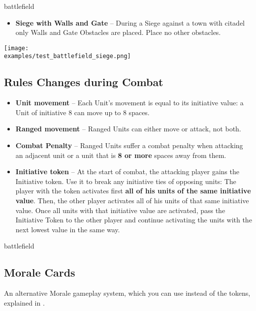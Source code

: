 \newpage
\begin{expansion}{battlefield}
  \begin{multicols*}{2}
  \begin{itemize}
  	\item \textbf{Siege with Walls and Gate} – During a Siege against a town with citadel only Walls and Gate Obstacles are placed. Place no other obstacles. 
  \end{itemize}
  \texttt{[image: \\examples/test\_battlefield\_siege.png]}
  
  \columnbreak
  \subsection*{Rules Changes during Combat}
  \begin{itemize}
  	\item \textbf{Unit movement} – Each Unit's movement is equal to its initiative value: a Unit of initiative 8 can move up to 8 spaces.
  	\item \textbf{Ranged movement}  – Ranged  Units can either move or attack, not both.
  	\item \textbf{Combat Penalty} – Ranged  Units suffer a combat penalty when attacking an adjacent unit or a unit that is \textbf{8 or more} spaces away from them.
  	\item \textbf{Initiative token} – At the start of combat, the attacking player gains the Initiative token. 
  	Use it to break any initiative ties of opposing units: The player with the token activates first \textbf{all of his units of the same initiative value}.
  	Then, the other player activates all of his units of that same initiative value.
  	Once all units with that initiative value are activated, pass the Initiative Token to the other player and continue activating the units with the next lowest value in the same way.
  \end{itemize}
  \end{multicols*}
\end{expansion}

\begin{multicols*}{2}
\vspace*{1em}
\begin{expansion}{battlefield}
	\subsection*{Morale Cards}
	An alternative Morale gameplay system, which you can use instead of the tokens, explained in .
\end{expansion}
\end{multicols*}

